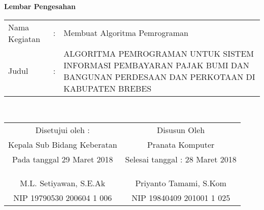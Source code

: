 \begin{center}
{\huge \bfseries Lembar Pengesahan}\\[0.4cm]

\begin{tabular}{l c p{10cm}}
  Nama Kegiatan & : & Membuat Algoritma Pemrograman  \\
  Judul & : & ALGORITMA PEMROGRAMAN UNTUK SISTEM INFORMASI PEMBAYARAN PAJAK BUMI DAN BANGUNAN PERDESAAN DAN PERKOTAAN DI KABUPATEN BREBES \\
\end{tabular}\\[2cm]

\begin{tabular}{c c}
  Disetujui oleh : & Disusun Oleh \\
  Kepala Sub Bidang Keberatan & Pranata Komputer \\
  Pada tanggal 29 Maret 2018 & Selesai tanggal : 28 Maret 2018 \\
  & \\
  & \\
  & \\
  M.L. Setiyawan, S.E.Ak & Priyanto Tamami, S.Kom \\
  NIP 19790530 200604 1 006 & NIP 19840409 201001 1 025
\end{tabular}

\end{center}